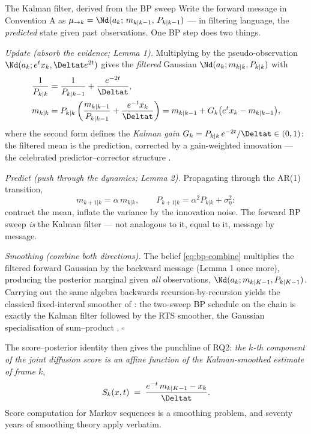 \begin{toolbox}{The Kalman filter, derived from the BP sweep}
Write the forward message in Convention A as
$\mu_{\to k} = \Nd(a_k;\, m_{k|k-1},\, P_{k|k-1})$ --- in filtering
language, the \emph{predicted} state given past observations. One BP step
does two things.

\emph{Update (absorb the evidence; Lemma 1).} Multiplying by the
pseudo-observation $\Nd(a_k; e^t x_k, \Deltat e^{2t})$ gives the
\emph{filtered} Gaussian $\Nd(a_k; m_{k|k}, P_{k|k})$ with
\begin{align*}
  \frac{1}{P_{k|k}} &= \frac{1}{P_{k|k-1}} + \frac{e^{-2t}}{\Deltat},\\
  m_{k|k} &= P_{k|k} \left( \frac{m_{k|k-1}}{P_{k|k-1}}
        + \frac{e^{-t} x_k}{\Deltat} \right)
  = m_{k|k-1} + G_k \big( e^{t} x_k - m_{k|k-1} \big),
\end{align*}
where the second form defines the \emph{Kalman gain}
$G_k = P_{k|k} \, e^{-2t}/\Deltat \in (0,1)$: the filtered mean is the
prediction, corrected by a gain-weighted innovation --- the celebrated
predictor--corrector structure \citep{kalman1960new}.

\emph{Predict (push through the dynamics; Lemma 2).} Propagating through
the AR(1) transition,
\begin{equation*}
  m_{k+1|k} = \alpha\, m_{k|k},
  \qquad
  P_{k+1|k} = \alpha^2 P_{k|k} + \sigma_\eta^2 :
\end{equation*}
contract the mean, inflate the variance by the innovation noise. The
forward BP sweep \emph{is} the Kalman filter --- not analogous to it,
equal to it, message by message.

\emph{Smoothing (combine both directions).} The belief
\eqref{eq:bp-combine} multiplies the filtered forward Gaussian by the
backward message (Lemma 1 once more), producing the posterior marginal
given \emph{all} observations, $\Nd(a_k; m_{k|K-1}, P_{k|K-1})$. Carrying
out the same algebra backwards recursion-by-recursion yields the classical
fixed-interval smoother of \citet{rauch1965maximum}: the two-sweep BP
schedule on the chain is exactly the Kalman filter followed by the RTS
smoother, the Gaussian specialisation of sum--product
\citep{kschischang2001factor, bishop2006pattern}. \hfill$\square$
\end{toolbox}

The score--posterior identity then gives the punchline of RQ2: \emph{the
$k$-th component of the joint diffusion score is an affine function of the
Kalman-smoothed estimate of frame $k$},
\begin{equation}
  S_k(x, t)
  \;=\; \frac{e^{-t}\, m_{k|K-1} - x_k}{\Deltat} .
  \label{eq:bp-score-kalman}
\end{equation}
Score computation for Markov sequences is a smoothing problem, and seventy
years of smoothing theory apply verbatim.

